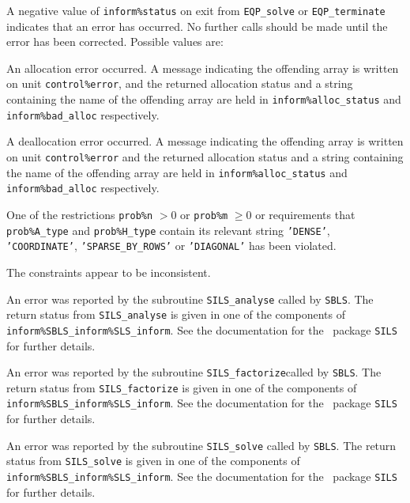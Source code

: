 \documentclass{galahad}
\newcommand{\packagename}{EQP}
\begin{document}

\galerrors
A negative value of {\tt inform\%status} on exit from 
{\tt \packagename\_solve}
or 
{\tt \packagename\_terminate}
indicates that an error has occurred. No further calls should be made
until the error has been corrected. Possible values are:

\begin{description}

 An allocation error occurred. 
A message indicating the offending 
array is written on unit {\tt control\%error}, and the returned allocation 
status and a string containing the name of the offending array
are held in {\tt inform\%alloc\_\-status}
and {\tt inform\%bad\_alloc} respectively.

 A deallocation error occurred. 
A message indicating the offending 
array is written on unit {\tt control\%error} and the returned allocation 
status and a string containing the name of the offending array
are held in {\tt inform\%alloc\_\-status}
and {\tt inform\%bad\_alloc} respectively.

 One of the restrictions 
{\tt prob\%n} $> 0$ or {\tt prob\%m} $\geq  0$
    or requirements that {\tt prob\%A\_type} 
    and {\tt prob\%H\_type} contain its relevant string
    {\tt 'DENSE'}, {\tt 'COORDINATE'}, {\tt 'SPARSE\_BY\_ROWS'}
    or {\tt 'DIAGONAL'}
    has been violated.

 The constraints appear to be inconsistent.

 An error was reported by the subroutine 
{\tt SILS\_analyse} called by {\tt SBLS}. 
The return status from {\tt SILS\_analyse} is given in one of the
components of {\tt inform\%SBLS\_inform\%SLS\_inform}.
See the documentation for the \galahad\ package {\tt SILS} for further details.

 An error was reported by the subroutine 
{\tt SILS\_factorize}called by {\tt SBLS}. 
The return status from {\tt SILS\_factorize} is given in one of the
components of {\tt inform\%SBLS\_inform\%SLS\_inform}.
See the documentation for the \galahad\ package {\tt SILS} for further details.

 An error was reported by the subroutine 
{\tt SILS\_solve} called by {\tt SBLS}.  
The return  status from {\tt SILS\_solve} is given in one of the
components of {\tt inform\%SBLS\_inform\%SLS\_inform}.
See the documentation for the \galahad\ package {\tt SILS} for further details.


\end{description}
\end{document}
